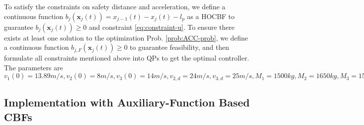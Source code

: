 \documentclass[letterpaper, 10 pt, conference]{ieeeconf}
\theoremstyle{definition}
\begin{document}
To satisfy the constraints on safety distance and acceleration, we define a continuous function $b_{j}(\boldsymbol{x}_{j}(t))=x_{j-1}(t)-x_{j}(t)-l_{p}$ as a HOCBF to guarantee $b_{j}(\boldsymbol{x}_{j}(t))\ge 0$ and constraint \eqref{eq:constraint-u}. To ensure there exists at least one solution to the  optimization Prob. \ref{prob:ACC-prob}, we define a continuous function $b_{j,F}(\boldsymbol{x}_{j}(t))\ge 0$ to guarantee feasibility, and then formulate all constraints mentioned above into QPs to get the optimal controller. The parameters are $v_{1}(0)=13.89m/s,v_{2}(0)=8 m/s, v_{3}(0)=14m/s, v_{2,d}=24m/s, v_{3,d}=25m/s, M_{1}=1500kg, M_{2}=1650kg, M_{3}=1550kg, g=9.81m/s^{2}, x_{1}(0)=0m, x_{2}(0)=-100m, x_{3}(0)=-190m, l_{p}=10m, f_{0}=0.1N, f_{1}=5Ns/m, f_{2}=0.25Ns^{2}/m, c_{2,a}=0.4, c_{3,a}=0.35.$
\subsection{Implementation with Auxiliary-Function Based CBFs}
\end{document}
